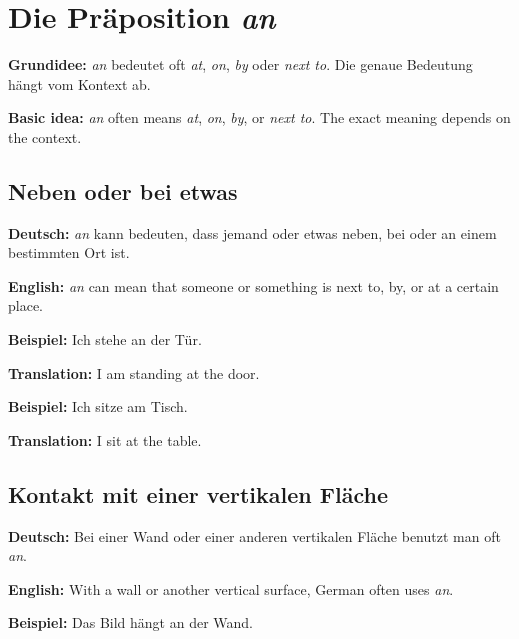 \documentclass[a4paper]{article}
\title{}
\date{}
\author{Mohammad Rahmani}
\begin{document}
    \maketitle
    
    
    \section{Die Präposition \textit{an}}
        
        \textbf{Grundidee:} \textit{an} bedeutet oft \textit{at}, \textit{on}, \textit{by} oder \textit{next to}. Die genaue Bedeutung hängt vom Kontext ab.
        
        \textbf{Basic idea:} \textit{an} often means \textit{at}, \textit{on}, \textit{by}, or \textit{next to}. The exact meaning depends on the context.
        
        \subsection{Neben oder bei etwas}
            
            \textbf{Deutsch:} \textit{an} kann bedeuten, dass jemand oder etwas neben, bei oder an einem bestimmten Ort ist.
            
            \textbf{English:} \textit{an} can mean that someone or something is next to, by, or at a certain place.
            
            \textbf{Beispiel:} Ich stehe an der Tür.
            
            \textbf{Translation:} I am standing at the door.
            
            \textbf{Beispiel:} Ich sitze am Tisch.
            
            \textbf{Translation:} I sit at the table.
        
        \subsection{Kontakt mit einer vertikalen Fläche}
            
            \textbf{Deutsch:} Bei einer Wand oder einer anderen vertikalen Fläche benutzt man oft \textit{an}.
            
            \textbf{English:} With a wall or another vertical surface, German often uses \textit{an}.
            
            \textbf{Beispiel:} Das Bild hängt an der Wand.
            
\end{document}
